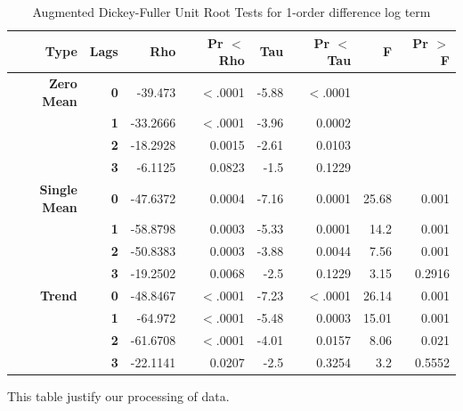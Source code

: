 \documentclass{article}
\begin{document}
\begin{table}[!ht]
\centering
\begin{tabular}{rrrrrrrr}

{\bf Type} & {\bf Lags} &  {\bf Rho} & {\bf Pr $<$ Rho} &  {\bf Tau} & {\bf Pr $<$ Tau} &    {\bf F} & {\bf Pr $>$ F} \\
\hline
\hline
{\bf Zero Mean} &    {\bf 0} &    -39.473 &     $<$.0001 &      -5.88 &     $<$.0001 &            &            \\

    {\bf } &    {\bf 1} &   -33.2666 &     $<$.0001 &      -3.96 &     0.0002 &            &            \\

    {\bf } &    {\bf 2} &   -18.2928 &     0.0015 &      -2.61 &     0.0103 &            &            \\

    {\bf } &    {\bf 3} &    -6.1125 &     0.0823 &       -1.5 &     0.1229 &            &            \\

{\bf Single Mean} &    {\bf 0} &   -47.6372 &     0.0004 &      -7.16 &     0.0001 &      25.68 &      0.001 \\

    {\bf } &    {\bf 1} &   -58.8798 &     0.0003 &      -5.33 &     0.0001 &       14.2 &      0.001 \\

    {\bf } &    {\bf 2} &   -50.8383 &     0.0003 &      -3.88 &     0.0044 &       7.56 &      0.001 \\

    {\bf } &    {\bf 3} &   -19.2502 &     0.0068 &       -2.5 &     0.1229 &       3.15 &     0.2916 \\

{\bf Trend} &    {\bf 0} &   -48.8467 &     $<$.0001 &      -7.23 &     $<$.0001 &      26.14 &      0.001 \\

    {\bf } &    {\bf 1} &    -64.972 &     $<$.0001 &      -5.48 &     0.0003 &      15.01 &      0.001 \\

    {\bf } &    {\bf 2} &   -61.6708 &     $<$.0001 &      -4.01 &     0.0157 &       8.06 &      0.021 \\

    {\bf } &    {\bf 3} &   -22.1141 &     0.0207 &       -2.5 &     0.3254 &        3.2 &     0.5552 \\
\hline
\end{tabular}  
\caption{Augmented Dickey-Fuller Unit Root Tests for 1-order difference log term}
\end{table}
This table justify our processing of data.
\end{document}
